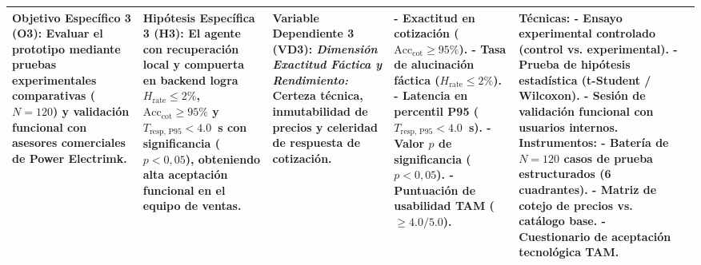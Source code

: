 \begin{landscape}
\begin{table}[H]
\begin{tabular}{p{3.8cm} p{3.8cm} p{3.8cm} p{3.0cm} p{3.0cm} p{3.0cm}}
\textbf{Objetivo Específico 3 (O3):} \newline
Evaluar el prototipo mediante pruebas experimentales comparativas ($N=120$) y validación funcional con asesores comerciales de Power Electrimk. &
\textbf{Hipótesis Específica 3 (H3):} \newline
El agente con recuperación local y compuerta en backend logra $H_{\text{rate}} \le 2\%$, $\text{Acc}_{\text{cot}} \ge 95\%$ y $T_{\text{resp, P95}} < 4.0$~s con significancia ($p < 0{,}05$), obteniendo alta aceptación funcional en el equipo de ventas. &
\textbf{Variable Dependiente 3 (VD3):} \newline
\textit{Dimensión Exactitud Fáctica y Rendimiento:} \newline
Certeza técnica, inmutabilidad de precios y celeridad de respuesta de cotización. &
- Exactitud en cotización ($\text{Acc}_{\text{cot}} \ge 95\%$). \newline
- Tasa de alucinación fáctica ($H_{\text{rate}} \le 2\%$). \newline
- Latencia en percentil P95 ($T_{\text{resp, P95}} < 4.0$~s). \newline
- Valor $p$ de significancia ($p < 0{,}05$). \newline
- Puntuación de usabilidad TAM ($\ge 4.0/5.0$). &
\textbf{Técnicas:} \newline
- Ensayo experimental controlado (control vs. experimental). \newline
- Prueba de hipótesis estadística (t-Student / Wilcoxon). \newline
- Sesión de validación funcional con usuarios internos. \newline
\textbf{Instrumentos:} \newline
- Batería de $N=120$ casos de prueba estructurados (6 cuadrantes). \newline
- Matriz de cotejo de precios vs. catálogo base. \newline
- Cuestionario de aceptación tecnológica TAM. \\
\bottomrule
\end{tabular}
\end{table}
\end{landscape}

